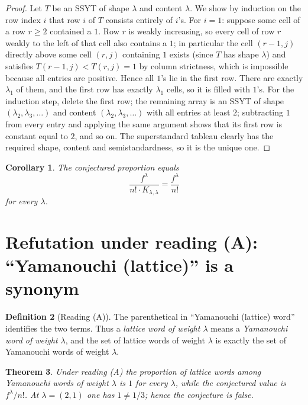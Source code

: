 \documentclass[11pt]{article}
\newtheorem{theorem}{Theorem}
\newtheorem{corollary}[theorem]{Corollary}
\theoremstyle{definition}
\newtheorem{definition}[theorem]{Definition}
\theoremstyle{remark}
\begin{document}
\begin{proof}
Let $T$ be an SSYT of shape $\lambda$ and content $\lambda$. We show by
induction on the row index $i$ that row $i$ of $T$ consists entirely of $i$'s.
For $i=1$: suppose some cell of a row $r\ge 2$ contained a $1$. Row $r$ is
weakly increasing, so every cell of row $r$ weakly to the left of that cell
also contains a $1$; in particular the cell $(r-1,j)$ directly above some cell
$(r,j)$ containing $1$ exists (since $T$ has shape $\lambda$) and satisfies
$T(r-1,j)<T(r,j)=1$ by column strictness, which is impossible because all
entries are positive. Hence all $1$'s lie in the first row. There are exactly
$\lambda_1$ of them, and the first row has exactly $\lambda_1$ cells, so it is
filled with $1$'s. For the induction step, delete the first row; the remaining
array is an SSYT of shape $(\lambda_2,\lambda_3,\dots)$ and content
$(\lambda_2,\lambda_3,\dots)$ with all entries at least $2$; subtracting $1$
from every entry and applying the same argument shows that its first row is
constant equal to $2$, and so on. The superstandard tableau clearly has the
required shape, content and semistandardness, so it is the unique one.
\end{proof}

\begin{corollary}\label{cor:collapse}
The conjectured proportion equals
\[
\frac{f^\lambda}{n!\cdot K_{\lambda,\lambda}}=\frac{f^\lambda}{n!}
\]
for every $\lambda$.
\end{corollary}

\section{Refutation under reading (A): ``Yamanouchi (lattice)'' is a synonym}

\begin{definition}[Reading (A)]
The parenthetical in ``Yamanouchi (lattice) word'' identifies the two terms.
Thus a \emph{lattice word of weight $\lambda$} means a \emph{Yamanouchi word of
weight $\lambda$}, and the set of lattice words of weight $\lambda$ is exactly
the set of Yamanouchi words of weight $\lambda$.
\end{definition}

\begin{theorem}\label{thm:A}
Under reading (A) the proportion of lattice words among Yamanouchi words of
weight $\lambda$ is $1$ for every $\lambda$, while the conjectured value is
$f^\lambda/n!$. At $\lambda=(2,1)$ one has $1\ne 1/3$; hence the conjecture is
false.
\end{theorem}
\end{document}
